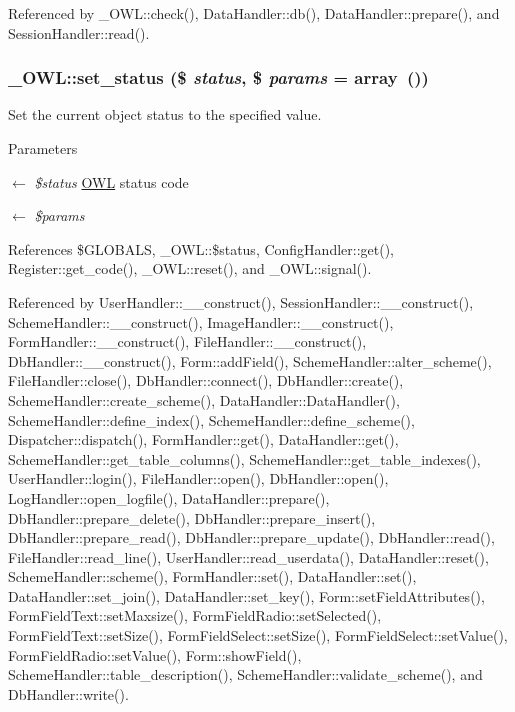Referenced by \_\-OWL::check(), DataHandler::db(), DataHandler::prepare(), and SessionHandler::read().

\subsubsection[{set\_\-status}]{\setlength{\rightskip}{0pt plus 5cm}\_\-OWL::set\_\-status (\$ {\em status}, \/  \$ {\em params} = {\ttfamily array~()})}\label{class__OWL_aea912d0ede9b3c2a69b79072d94d4787}
Set the current object status to the specified value.


\begin{DoxyParams}{Parameters}
\item[\mbox{$\leftarrow$} {\em \$status}]\hyperlink{classOWL}{OWL} status code \item[\mbox{$\leftarrow$} {\em \$params}]\end{DoxyParams}


References \$GLOBALS, \_\-OWL::\$status, ConfigHandler::get(), Register::get\_\-code(), \_\-OWL::reset(), and \_\-OWL::signal().



Referenced by UserHandler::\_\-\_\-construct(), SessionHandler::\_\-\_\-construct(), SchemeHandler::\_\-\_\-construct(), ImageHandler::\_\-\_\-construct(), FormHandler::\_\-\_\-construct(), FileHandler::\_\-\_\-construct(), DbHandler::\_\-\_\-construct(), Form::addField(), SchemeHandler::alter\_\-scheme(), FileHandler::close(), DbHandler::connect(), DbHandler::create(), SchemeHandler::create\_\-scheme(), DataHandler::DataHandler(), SchemeHandler::define\_\-index(), SchemeHandler::define\_\-scheme(), Dispatcher::dispatch(), FormHandler::get(), DataHandler::get(), SchemeHandler::get\_\-table\_\-columns(), SchemeHandler::get\_\-table\_\-indexes(), UserHandler::login(), FileHandler::open(), DbHandler::open(), LogHandler::open\_\-logfile(), DataHandler::prepare(), DbHandler::prepare\_\-delete(), DbHandler::prepare\_\-insert(), DbHandler::prepare\_\-read(), DbHandler::prepare\_\-update(), DbHandler::read(), FileHandler::read\_\-line(), UserHandler::read\_\-userdata(), DataHandler::reset(), SchemeHandler::scheme(), FormHandler::set(), DataHandler::set(), DataHandler::set\_\-join(), DataHandler::set\_\-key(), Form::setFieldAttributes(), FormFieldText::setMaxsize(), FormFieldRadio::setSelected(), FormFieldText::setSize(), FormFieldSelect::setSize(), FormFieldSelect::setValue(), FormFieldRadio::setValue(), Form::showField(), SchemeHandler::table\_\-description(), SchemeHandler::validate\_\-scheme(), and DbHandler::write().

